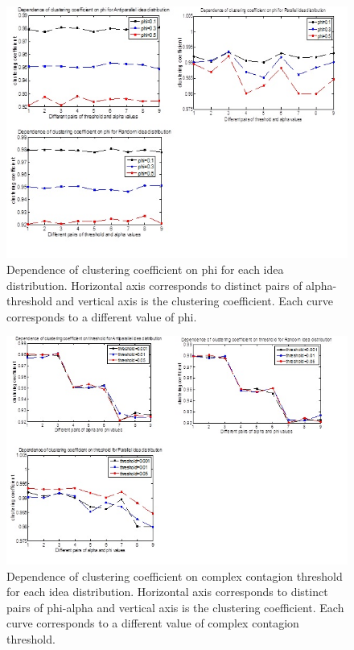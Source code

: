 \begin{figure}
[htp]
\begin{center}
\includegraphics{Fig16}
\end{center}
\caption{ Dependence of clustering coefficient on phi for each idea distribution. Horizontal axis corresponds to distinct pairs of alpha-     threshold and   vertical axis is the clustering coefficient. Each curve corresponds to a different value of phi.}
\label {fig16}
\end{figure}

\begin{figure}
[htp]
\begin{center}
\includegraphics{Fig19}
\end{center}
\caption{Dependence of clustering coefficient on complex contagion threshold for each idea distribution. Horizontal axis corresponds to distinct pairs of phi-alpha and   vertical axis is the clustering coefficient. Each curve corresponds to a different value of complex contagion threshold.}
\label {fig19}
\end{figure}

